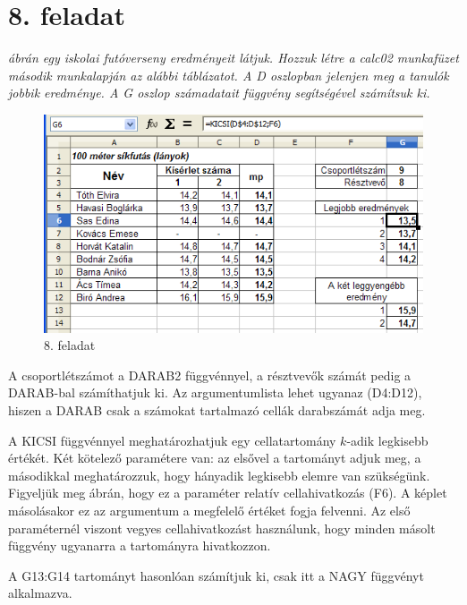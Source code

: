 \section{8. feladat}

{\itshape
{} ábrán egy iskolai futóverseny eredményeit látjuk. Hozzuk
létre a calc02 munkafüzet második munkalapján az alábbi
táblázatot. A D oszlopban jelenjen meg a tanulók jobbik
eredménye. A G oszlop számadatait függvény segítségével
számítsuk ki.}

\begin{figure}[!h]
\begin{center}
\includegraphics[width=14.125cm]{oocalcv2-img41.png}
\caption{8. feladat}\label{8-feladat}
\end{center}
\end{figure}

A csoportlétszámot a DARAB2 függvénnyel, a résztvevők
számát pedig a DARAB-bal számíthatjuk ki. Az argumentumlista
lehet ugyanaz (D4:D12), hiszen a DARAB csak a számokat tartalmazó
cellák darabszámát adja meg.

A KICSI függvénnyel meghatározhatjuk egy cellatartomány $k$-adik
legkisebb értékét. Két kötelező paramétere van: az
elsővel a tartományt adjuk meg, a másodikkal meghatározzuk,
hogy hányadik legkisebb elemre van szükségünk. Figyeljük meg
 ábrán, hogy ez a paraméter relatív cellahivatkozás
(F6). A képlet másolásakor ez az argumentum a megfelelő
értéket fogja felvenni. Az első paraméternél viszont vegyes
cellahivatkozást használunk, hogy minden másolt függvény
ugyanarra  a tartományra hivatkozzon.

A G13:G14 tartományt hasonlóan számítjuk ki, csak itt a NAGY
függvényt alkalmazva.


